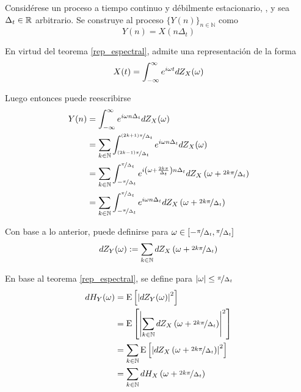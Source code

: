 %
%

Considérese un proceso a tiempo continuo y débilmente estacionario, \xt, y sea $\Delta_t \in \mathbb{R}$ arbitrario.
%
Se construye al proceso $\{Y(n)\}_{n\in \mathbb{N}}$ como
\begin{equation}
Y(n) = X(n \Delta_t)
\end{equation}

En virtud del teorema \ref{rep_espectral}, \xt admite una representación de la forma
\begin{equation}
X(t) = \int_{-\infty}^{\infty} e^{i \omega t }  dZ_X(\omega)
\end{equation}

Luego entonces puede reescribirse
\begin{align}
Y(n) &= \int_{-\infty}^{\infty} e^{i \omega n \Delta_t} dZ_X(\omega) \nonumber \\
&= \sum_{k \in \mathbb{N}} \int_{\nicefrac{(2k-1)\pi}{\Delta_t}}^{\nicefrac{(2k+1)\pi}{\Delta_t}}
e^{i \omega n \Delta_t} dZ_X(\omega) \nonumber \\
&= \sum_{k \in \mathbb{N}} \int_{-\nicefrac{\pi}{\Delta_t}}^{\nicefrac{\pi}{\Delta_t}}
e^{i \left( \omega + \frac{2 k \pi}{\Delta_t} \right) n \Delta_t}
dZ_X\left( \omega + \nicefrac{2 k \pi}{\Delta_t}\right) \nonumber \\
&= \sum_{k \in \mathbb{N}} \int_{-\nicefrac{\pi}{\Delta_t}}^{\nicefrac{\pi}{\Delta_t}}
e^{i \omega n \Delta_t}
dZ_X\left( \omega + \nicefrac{2 k \pi}{\Delta_t}\right)
\end{align}

Con base a lo anterior, puede definirse para 
$\omega \in \left[ -\nicefrac{\pi}{\Delta_t} , \nicefrac{\pi}{\Delta_t} \right]$
\begin{equation}
dZ_Y(\omega) := \sum_{k \in \mathbb{N}} dZ_X\left( \omega + \nicefrac{2 k \pi}{\Delta_t}\right)
\end{equation}

En base al teorema \ref{rep_espectral}, se define para 
$\left| \omega \right| \leq \nicefrac{\pi}{\Delta_t}$
\begin{align}
dH_Y(\omega) &= \mathrm{E}\left[ \left| dZ_Y(\omega) \right|^{2} \right] \nonumber \\
&= \mathrm{E}\left[ \left| \sum_{k \in \mathbb{N}} dZ_X\left( \omega + \nicefrac{2 k \pi}{\Delta_t}\right) \right|^{2} \right]
\nonumber \\
&= \sum_{k \in \mathbb{N}} \mathrm{E}\left[ \left| dZ_X\left( \omega + \nicefrac{2 k \pi}{\Delta_t}\right) \right|^{2} \right]
\nonumber \\
&= \sum_{k \in \mathbb{N}} dH_X\left( \omega + \nicefrac{2 k \pi}{\Delta_t}\right)
\end{align}


